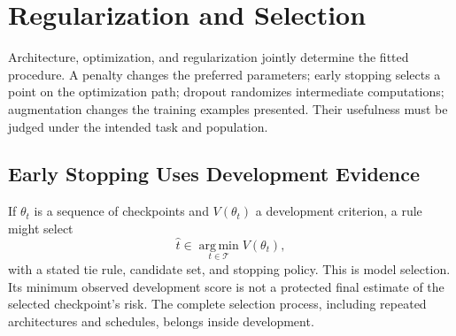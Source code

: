 \section{Regularization and Selection}

Architecture, optimization, and regularization jointly determine the fitted procedure. A penalty changes the preferred parameters; early stopping selects a point on the optimization path; dropout randomizes intermediate computations; augmentation changes the training examples presented. Their usefulness must be judged under the intended task and population.

\subsection{Early Stopping Uses Development Evidence}

If $\theta_t$ is a sequence of checkpoints and $V(\theta_t)$ a development criterion, a rule might select
\[
\hat t\in\operatorname*{arg\,min}_{t\in\mathcal T}V(\theta_t),
\]
with a stated tie rule, candidate set, and stopping policy. This is model selection. Its minimum observed development score is not a protected final estimate of the selected checkpoint's risk. The complete selection process, including repeated architectures and schedules, belongs inside development.

\par\addvspace{\intextsep}\noindent\begin{minipage}{\linewidth}
\centering
{}
\label{fig:early-stopping-curve}
\end{minipage}\par\addvspace{\intextsep}

